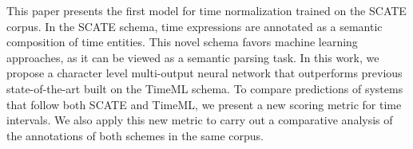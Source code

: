 This paper presents the first model for time normalization trained on the SCATE corpus. In the SCATE schema, time expressions are annotated as a semantic composition of time entities. This novel schema favors machine learning approaches, as it can be viewed as a semantic parsing task. In this work, we propose a character level multi-output neural network that outperforms previous state-of-the-art built on the TimeML schema. To compare predictions of systems that follow both SCATE and TimeML, we present a new scoring metric for time intervals. We also apply this new metric to carry out a comparative analysis of the annotations of both schemes in the same corpus.